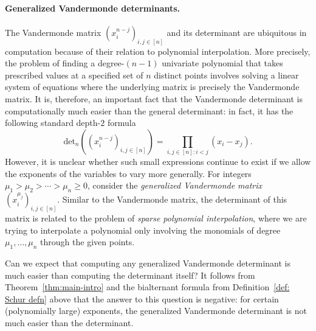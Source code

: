 \paragraph*{Generalized Vandermonde determinants.} The Vandermonde matrix $(x_i^{n-j})_{i,j\in [n]}$ and its determinant are ubiquitous in computation because of their relation to polynomial interpolation. More precisely, the problem of finding a degree-$(n-1)$ univariate polynomial that takes prescribed values at a specified set of $n$ distinct points involves solving a linear system of equations where the underlying matrix is precisely the Vandermonde matrix. It is, therefore, an important fact that the Vandermonde determinant is computationally much easier than the general determinant: in fact, it has the following standard depth-$2$ formula
\[
\mathrm{det}_n\left((x_i^{n-j})_{i,j\in [n]}\right) = \prod_{i,j\in [n]: i < j}(x_i - x_j).
\]
However, it is unclear whether such small expressions continue to exist if we allow the exponents of the variables to vary more generally. For integers $\mu_1 > \mu_2 > \cdots > \mu_n \geq 0$, consider the \emph{generalized Vandermonde matrix} $(x_i^{\mu_j})_{i,j\in [n]}$. Similar to the Vandermonde matrix, the determinant of this matrix is related to the problem of \emph{sparse polynomial interpolation}, where we are trying to interpolate a polynomial only involving  the monomials of degree $\mu_1,\ldots,\mu_n$ through the given points. 

Can we expect that computing any generalized Vandermonde determinant is much easier than computing the determinant itself? It follows from Theorem~\ref{thm:main-intro} and the bialternant formula from Definition~\ref{def: Schur defn} above that the answer to this question is negative: for certain (polynomially large) exponents, the generalized Vandermonde determinant is not much easier than the determinant.




\setcounter{section}{1}
